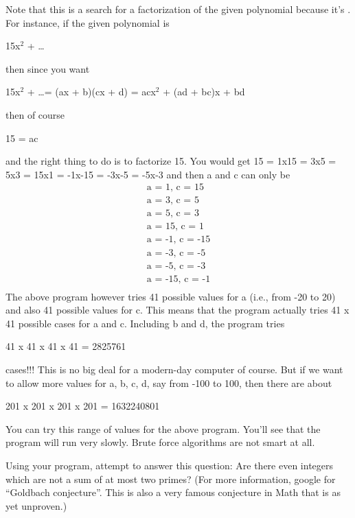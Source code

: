 \begin{console}
Note that this is a  search for a factorization of
the given polynomial because it's .
For instance, if the given polynomial is
\begin{center}
15x$^{2}$ + \ldots
\end{center}
then since you want
\begin{center}
15x$^{2}$ + \ldots = (ax + b)(cx + d) = acx$^2$ + (ad + bc)x + bd
\end{center}
then of course
\begin{center}
15 = ac
\end{center}
and the right thing to do is to factorize 15. You would get 15 = 1x15 =
3x5 = 5x3 = 15x1 = -1x-15 = -3x-5 = -5x-3 and then a and c can only be
\begin{align*}
\text{a = 1, c = 15}\\
\text{a = 3, c = 5}\\
\text{a = 5, c = 3}\\
\text{a = 15, c = 1}\\
\text{a = -1, c = -15}\\
\text{a = -3, c = -5}\\
\text{a = -5, c = -3}\\
\text{a = -15, c = -1}\\
\end{align*}
The above program however tries 41 possible values for a (i.e., from -20
to 20) and also 41 possible values for c. This means that the program
actually tries 41 x 41 possible cases for a and c. Including b and d,
the program tries
\begin{center}
41 x 41 x 41 x 41 = 2825761
\end{center}
cases!!! This is no big deal for a modern-day computer of course. But if
we want to allow more values for a, b, c, d, say from -100 to 100, then
there are about
\begin{center}
201 x 201 x 201 x 201 = 1632240801
\end{center}
You can try this range of values for the above program.
You'll see that the program will run very slowly. Brute
force algorithms are not smart at all.

Using your program, attempt to answer this question: Are there even
integers which are not a sum of at most two primes? (For more
information, google for ``Goldbach conjecture''. This is also a very
famous conjecture in Math that is as yet unproven.)

\newpage{}


\end{console}
